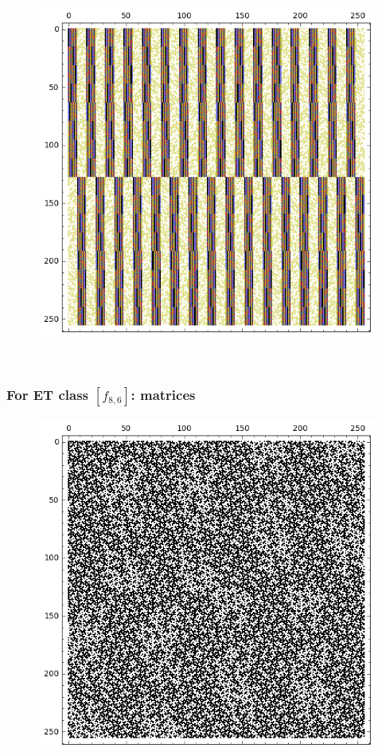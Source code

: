 \documentclass[pdf,sprung,slideColor,nocolorBG]{beamer}
\newenvironment{colortheme}[1]{
\def\ProvidesPackageRCS $##1${\relax}
\renewcommand{\ProcessOptions}{\relax}
\makeatletter

\makeatother
}{}
\begin{document}
\begin{colortheme}{jubata}
\begin{frame}
\begin{figure}
\begin{minipage}{.48\textwidth}
  \centering
  \includegraphics[width=.9\linewidth]{../matrix_plot/re8_5_bent_cayley_graph_index_matrix.png}
  \label{fig:8_5_bent_cayley_graph_index_matrix}
\end{minipage}
\end{figure}
~
\end{frame}
\begin{frame}
\frametitle{For ET class $[f_{8,6}]$: matrices}
\begin{figure}
\centering
\begin{minipage}{.48\textwidth}
  \centering
  \includegraphics[width=.9\linewidth]{../matrix_plot/re8_6_weight_class_matrix.png}

\end{minipage}
\end{figure}
\end{frame}
\end{colortheme}
\end{document}
